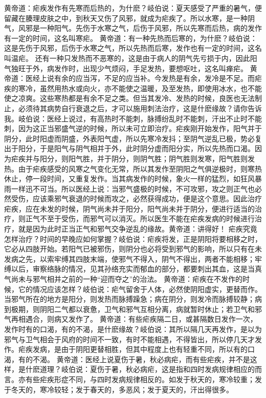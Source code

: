 \documentclass[12pt,UTF8]{ctexbook}
\begin{document}
黄帝道：疟疾发作有先寒而后热的，为什麽？岐伯说：夏天感受了严重的暑气，便留藏在腠理皮肤之中，到秋天又伤了风邪，就成为疟疾了。所以水寒，是一种阴气，风邪是一种阳气。先伤于水寒之气，后伤于风邪，所以先寒而后热，病的发作有一定的时间，这名叫寒疟。
黄帝道：有一种先热而后寒的，为什麽？岐伯说：这是先伤于风邪，后伤于水寒之气，所以先热而后寒，发作也有一定的时间，这名叫温疟。
还有一种只发热而不恶寒的，这是由于病人的阴气先亏损于内，因此阳气独旺于外，病发作时，出现少气烦闷，手足发热，要想呕吐，这名叫瘅疟。
黄帝道：医经上说有余的应当泻，不足的应当补。今发热是有余，发冷是不足。而疟疾的寒冷，虽然用热水或向火，亦不能使之温暖，及至发热，即使用冰水，也不能使之凉爽。这些寒热都是有余不足之类。但当其发冷、发热的时候，良医也无法制止，必须待其病势自行衰退之后，才可以施用刺法治疗，这是什麽缘故？请你告诉我。岐伯说：医经上说过，有高热时不能刺，脉搏纷乱时不能刺，汗出不止时不能刺，因为这正当邪盛气逆的时候，所以未可立即治疗。疟疾刚开始发作，阳气并于阴分，此时阳虚而阴盛，外表阳气虚，所以先寒冷发抖；至阴气逆乱已极，势必复出于阳分，于是阳气与阴气相并于外，此时阴分虚而阳分实，所以先热而口渴。因为疟疾并与阳分，则阳气胜，并于阴分，则阴气胜；阴气胜则发寒，阳气胜则发热。由于疟疾感受的风寒之气变化无常，所以其发作至阴阳之气俱逆极时，则寒热休止，停一段时间，又重复发作。当其病发作的时候，象火一样的猛烈，如狂风暴雨一样迅不可当。所以医经上说：当邪气盛极的时候，不可攻邪，攻之则正气也必然受伤，应该乘邪气衰退的时候而攻之，必然获得成功，便是这个意思。因此治疗疟疾，应在未发的时候，阴气尚未并于阳分，阳气尚未并于阴分，便进行适当的治疗，则正气不至于受伤，而邪气可以消灭。所以医生不能在疟疾发病的时候进行治疗，就是因为此时正当正气和邪气交争逆乱的缘故。黄帝道：讲得好！
疟疾究竟怎样治疗？时间的早晚应如何掌握？岐伯说：疟疾将发，正是阴阳将要相移之时，它必从四肢开始。若阳气已被邪伤，则阴分也必将受到邪气的影响，所以只有在未发病之先，以索牢缚其四肢末端，使邪气不得入，阴气不得出，两者不能相移；牢缚以后，审察络脉的情况，见其孙络充实而郁血的部分，都要刺出其血，这是当真气尚未与邪气相并之前的一种“迎而夺之”的治法。
黄帝道：疟疾在不发作的时候，它的情况应该怎样？岐伯说：疟气留舍于人体，必然使阴阳虚实，更替而作。当邪气所在的地方是阳分，则发热而脉搏躁急；病在阴分，则发冷而脉搏较静；病到极期，则阴阳二气都以衰惫，卫气和邪气互相分离，病就暂时休止；若卫气和邪气再相遇合，则病又发作了。
黄帝道：有些疟疾隔二日，或甚隔数日发作一次，发作时有的口渴，有的不渴，是什麽缘故？岐伯说：其所以隔几天再发作，是以为邪气与卫气相会于风府的时间不一致，有时不能相遇，不得皆出，所以停几天才发作。疟疾发病，是由于阴阳更替相胜，但其中程度上也有轻重不同，所以有的口渴，有的不渴。
黄帝道：医经上说夏伤于暑，秋必病疟，而有些疟疾，并不是这样，是什麽道理？岐伯说：夏伤于暑，秋必病疟，这是指和四时发病规律相应的而言。亦有些疟疾形症不同，与四时发病规律相反的。如发于秋天的，寒冷较重；发于冬天的，寒冷较轻；发于春天的，多恶风；发于夏天的，汗出得很多。
\end{document}
